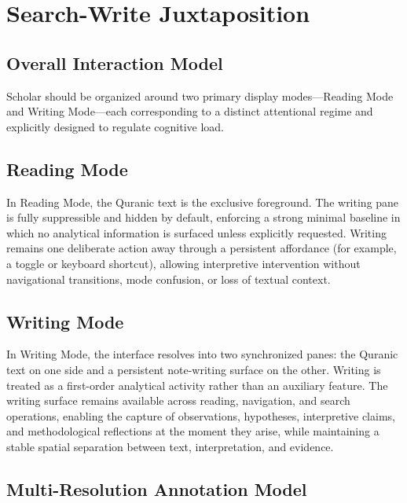 \documentclass[12pt,a4paper]{article}
\begin{document}
\section{Search-Write Juxtaposition}\label{search-write-juxtaposition}

\subsection{Overall Interaction Model}\label{overall-interaction-model}

Scholar should be organized around two primary display modes---Reading
Mode and Writing Mode---each corresponding to a distinct attentional
regime and explicitly designed to regulate cognitive load.

\subsection{Reading Mode}\label{reading-mode}

In Reading Mode, the Quranic text is the exclusive foreground. The
writing pane is fully suppressible and hidden by default, enforcing a
strong minimal baseline in which no analytical information is surfaced
unless explicitly requested. Writing remains one deliberate action away
through a persistent affordance (for example, a toggle or keyboard
shortcut), allowing interpretive intervention without navigational
transitions, mode confusion, or loss of textual context.

\subsection{Writing Mode}\label{writing-mode}

In Writing Mode, the interface resolves into two synchronized panes: the
Quranic text on one side and a persistent note-writing surface on the
other. Writing is treated as a first-order analytical activity rather
than an auxiliary feature. The writing surface remains available across
reading, navigation, and search operations, enabling the capture of
observations, hypotheses, interpretive claims, and methodological
reflections at the moment they arise, while maintaining a stable spatial
separation between text, interpretation, and evidence.

\subsection{Multi-Resolution Annotation
Model}\label{multi-resolution-annotation-model}
\end{document}
